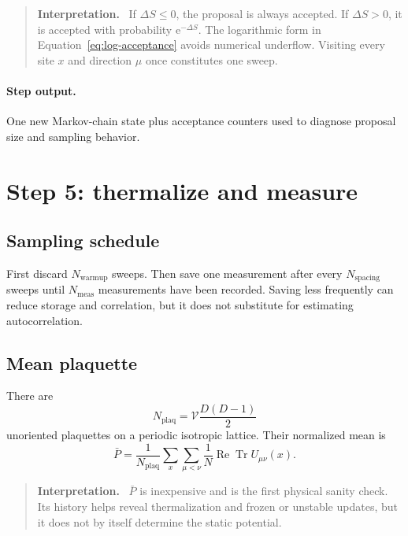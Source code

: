 \documentclass[11pt]{article}
\newcommand{\ReTr}{\operatorname{Re}\operatorname{Tr}}
\newcommand{\ee}{\mathrm{e}}
\newcommand{\Vlat}{\mathcal{V}}
\newcommand{\Nmeas}{N_{\mathrm{meas}}}
\newenvironment{interpretation}
  {\begin{quote}\small\noindent\textbf{Interpretation.}\ }
  {\end{quote}}
\begin{document}
\begin{interpretation}
If \(\Delta S\leq0\), the proposal is always accepted. If \(\Delta S>0\),
it is accepted with probability \(\ee^{-\Delta S}\). The logarithmic form in
Equation~\eqref{eq:log-acceptance} avoids numerical underflow. Visiting every
site \(x\) and direction \(\mu\) once constitutes one sweep.
\end{interpretation}

\paragraph{Step output.}
One new Markov-chain state plus acceptance counters used to diagnose proposal
size and sampling behavior.

\section{Step 5: thermalize and measure}

\subsection{Sampling schedule}

First discard \(N_{\mathrm{warmup}}\) sweeps. Then save one measurement after
every \(N_{\mathrm{spacing}}\) sweeps until \(\Nmeas\) measurements have been
recorded. Saving less frequently can reduce storage and correlation, but it
does not substitute for estimating autocorrelation.

\subsection{Mean plaquette}

There are
\begin{equation}
  N_{\mathrm{plaq}}=\Vlat\frac{D(D-1)}{2}
  \label{eq:plaquette-count}
\end{equation}
unoriented plaquettes on a periodic isotropic lattice. Their normalized mean is
\begin{equation}
  \bar P=
  \frac{1}{N_{\mathrm{plaq}}}
  \sum_x\sum_{\mu<\nu}
  \frac{1}{N}\ReTr U_{\mu\nu}(x).
  \label{eq:mean-plaquette}
\end{equation}

\begin{interpretation}
\(\bar P\) is inexpensive and is the first physical sanity check. Its history
helps reveal thermalization and frozen or unstable updates, but it does not by
itself determine the static potential.
\end{interpretation}
\end{document}
